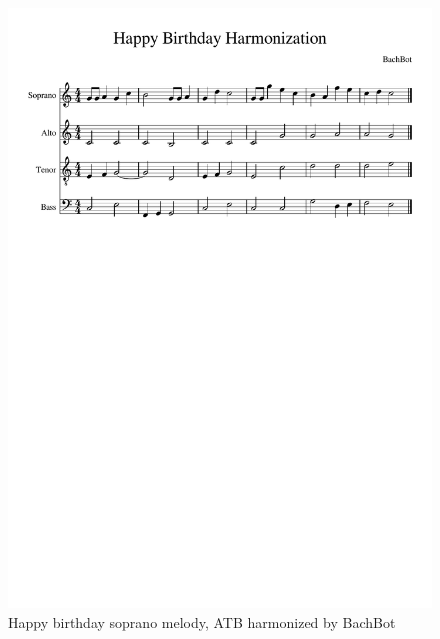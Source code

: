 \begin{figure}[tb]
  \centering
  \includegraphics[trim={0 19cm 0 3.7cm},clip,width=0.9\linewidth]{happy-birthday-score.pdf}
  \caption{Happy birthday soprano melody, ATB harmonized by BachBot}
  \label{fig:harm-happy-birthday}
\end{figure}

